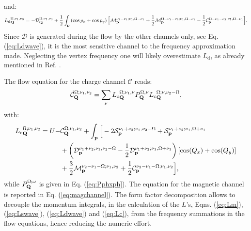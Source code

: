 and: 
\begin{align} 
\label{eq:Ldwave}
{L_\mathrm{d}}^{\Omega;\nu_1,\nu_3}_{\mathbf{Q}}=-\mathcal{D}_{\mathbf{Q}}^{\Omega;\nu_1,\nu_3} 
+ \frac{1}{2}\int_{\mathbf{p}} \left(\cos{p_x}+\cos{p_y}\right) \Big[ \mathcal{M}_{\mathbf{p}}^{\nu_3-\nu_1;\nu_1,\Omega-\nu_1} + \frac{1}{2} \mathcal{M}_{\mathbf{p}}^{\Omega-\nu_1-\nu_3;\nu_1,\Omega-\nu_1} - \frac{1}{2} \mathcal{C}_{\mathbf{p}}^{\Omega-\nu_1-\nu_3;\nu_1,\Omega-\nu_1} \Big].
\end{align}	 
Since $\mathcal{D}$ is generated during the flow by the other channels only, see Eq. (\ref{eq:Ldwave}), it is the most sensitive channel to the frequency approximation made.  
Neglecting the vertex frequency one will likely overestimate $L_{\mathrm{d}}$, as already mentioned in Ref. .

The flow equation for the charge channel $\mathcal{C}$ reads:
\begin{equation}
\dot{\mathcal{C}}_{\mathbf{Q}}^{\Omega;\nu_1,\nu_2} = \sum_{\nu}{L_\mathrm{c}}^{\Omega; \nu_1,\nu}_{\mathbf{Q}} P_{\mathbf{Q}}^{\Omega,\nu} {L_\mathrm{c}}^{\Omega; \nu,\nu_2-\Omega}_{\mathbf{Q}}, 
\end{equation} 	   
with: 
 \begin{align} 
 \label{eq:Lc}
{L_\mathrm{c}}^{\Omega;\nu_1,\nu_2}_{\mathbf{Q}}=U-&\mathcal{C}_{\mathbf{Q}}^{\Omega;\nu_1,\nu_2} 
+ \int_{\mathbf{p}} \Big [
- 2 \mathcal{S}_{\mathbf{p}}^{\nu_1+\nu_2;\nu_1,\nu_2-\Omega} + \mathcal{S}_{\mathbf{p}}^{\nu_1+\nu_2;\nu_1,\Omega+\nu_1}
\\ &+ \left( \mathcal{D}_{\mathbf{p}}^{\nu_1+\nu_2;\nu_1,\nu_2-\Omega} -\frac{1}{2} \mathcal{D}_{\mathbf{p}}^{\nu_1+\nu_2;\nu_1,\Omega+\nu_1} \right) [\cos(Q_x)+\cos(Q_y)]
\\ &+ \frac{3}{2} \mathcal{M}_{\mathbf{p}}^{\nu_2-\nu_1-\Omega;\nu_1,\nu_2} 
+ \frac{1}{2} \mathcal{C}_{\mathbf{p}}^{\nu_2-\nu_1-\Omega;\nu_1,\nu_2} \Big],
\end{align}
while $P_{\mathbf{Q}}^{\Omega;\omega}$ is given in Eq. (\ref{eq:Pphxph}).
The equation for the magnetic channel is reported in Eq. (\ref{eq:magchannel}).
The form factor decomposition allows to decouple the momentum integrals, in the calculation of the $L$'s, Eqns. (\ref{eq:Lm}), (\ref{eq:Lswave}), (\ref{eq:Ldwave}) and (\ref{eq:Lc}), from the frequency summations in the flow equations, hence reducing the numeric effort.   	 


